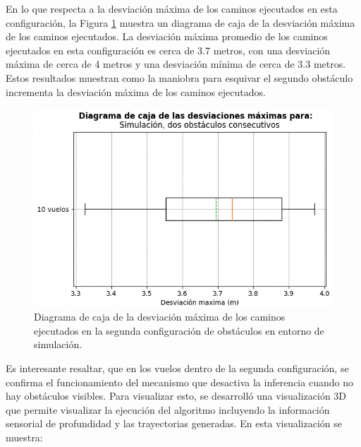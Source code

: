 En lo que respecta a la desviación máxima de los caminos ejecutados en esta configuración, la Figura \ref{fig:double-max-deviation} muestra un diagrama de caja de la desviación máxima de los caminos ejecutados. La desviación máxima promedio de los caminos ejecutados en esta configuración es cerca de 3.7 metros, con una desviación máxima de cerca de 4 metros y una desviación mínima de cerca de 3.3 metros. Estos resultados muestran como la maniobra para esquivar el segundo obstáculo incrementa la desviación máxima de los caminos ejecutados.

\begin{figure}[H]
    \centering
    \includegraphics[scale=0.55]{partes/img/sim-double-panel-box.png}
    \caption[Diagrama de caja de la desviación máxima de los caminos ejecutados en la segunda configuración de obstáculos en entorno de simulación.]{Diagrama de caja de la desviación máxima de los caminos ejecutados en la segunda configuración de obstáculos en entorno de simulación.}
    \label{fig:double-max-deviation}
\end{figure}

Es interesante resaltar, que en los vuelos dentro de la segunda configuración, se confirma el funcionamiento del mecanismo que desactiva la inferencia cuando no hay obstáculos visibles. Para visualizar esto, se desarrolló una visualización 3D que permite visualizar la ejecución del algoritmo incluyendo la información sensorial de profundidad y las trayectorias generadas. En esta visualización se muestra:

